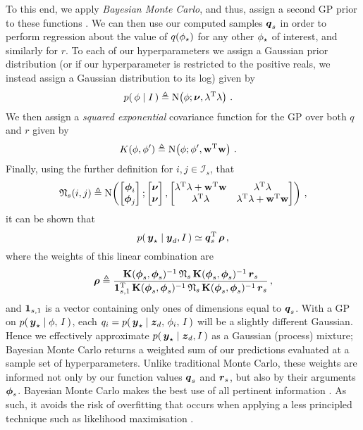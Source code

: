 \documentclass{acmtrans2m}
\begin{document}
To this end, we apply \emph{Bayesian Monte Carlo}, and thus, assign a second GP prior to these functions \cite{BZMonteCarlo}. We can then use our computed samples $\boldsymbol{q}_s$ in order to perform regression about the value of $q(\phi_\star)$ for any other $\phi_\star$ of interest, and similarly for $r$. To each of our hyperparameters we assign a Gaussian prior distribution (or if our hyperparameter is restricted to the positive reals, we instead assign a Gaussian distribution to its log) given by
\begin{align}
 p\!\left(\,\phi\mid I\,\right) & \triangleq \text{N}\!\left(\phi;\boldsymbol{\nu},\mathbf{\lambda}^{\mathrm{T}} \mathbf{\lambda}\right) \label{eq:phiprior}\,.
\end{align}
We then assign a {\em squared exponential} covariance function for the GP over both $q$ and $r$ given by
\begin{align}
 K(\phi,\phi') & \triangleq \text{N}\!\left(\phi;\phi',\mathbf{w}^{\mathrm{T}} \mathbf{w}\right) \label{eq:BMCsqdexp}\,.
\end{align}
Finally, using the further definition for $i,j \in \mathcal{I}_s$, that
\begin{equation}
\mathbf{\mathfrak{N}}_s(i,j) \triangleq \text{N}\!\left(\begin{bmatrix} \boldsymbol{\phi}_i \\ \boldsymbol{\phi}_j \end{bmatrix};\begin{bmatrix} \boldsymbol{\nu} \\ \boldsymbol{\nu} \end{bmatrix},\begin{bmatrix}  \mathbf{\lambda}^{\mathrm{T}} \mathbf{\lambda}+\mathbf{w}^{\mathrm{T}} \mathbf{w} & \mathbf{\lambda}^{\mathrm{T}} \mathbf{\lambda} \\ \mathbf{\lambda}^{\mathrm{T}} \mathbf{\lambda} & \mathbf{\lambda}^{\mathrm{T}} \mathbf{\lambda}+\mathbf{w}^{\mathrm{T}} \mathbf{w}
\end{bmatrix}\right)\,,
\end{equation}
it can be shown that
\begin{equation} \label{eq:muPsi}
p\!\left(\,\boldsymbol{y}_\star\mid\boldsymbol{y}_d,I\,\right) \simeq \boldsymbol{q}_s^{\mathrm{T}}\,\boldsymbol{\rho}\,,
\end{equation}
where the weights of this linear combination are
\begin{equation}
\boldsymbol{\rho}\triangleq\frac{\mathbf{K}(\boldsymbol{\phi}_s,\boldsymbol{\phi}_s)^{-1}\,\mathbf{\mathfrak{N}}_s\,\mathbf{K}(\boldsymbol{\phi}_s,\boldsymbol{\phi}_s)^{-1}\,\boldsymbol{r}_s}
{\mathbf{1}_{s,1}^{\mathrm{T}}\,\mathbf{K}(\boldsymbol{\phi}_s,\boldsymbol{\phi}_s)^{-1}\,\mathbf{\mathfrak{N}}_s\,\mathbf{K}(\boldsymbol{\phi}_s,\boldsymbol{\phi}_s)^{-1}\,\boldsymbol{r}_s}\,,
\end{equation}
and $\mathbf{1}_{s,1}$ is a vector containing only ones of dimensions equal to $\boldsymbol{q}_s$. With a GP on 
$p\!\left(\,\boldsymbol{y}_\star\mid\phi,\,I\,\right)$, each $q_i = p\!\left(\,\boldsymbol{y}_\star\mid\boldsymbol{z}_d,\,\phi_i,\,I\,\right)$ will be a slightly different Gaussian. Hence we effectively approximate $p\!\left(\,\boldsymbol{y}_\star\mid\boldsymbol{z}_d,I\,\right)$ as a Gaussian (process) mixture; Bayesian Monte Carlo returns a weighted sum of our predictions evaluated at a sample set of hyperparameters. Unlike traditional Monte Carlo, these weights are informed not only by our function values $\boldsymbol{q}_s$ and $\boldsymbol{r}_s$, but also by their arguments $\boldsymbol{\phi}_s$. Bayesian Monte Carlo makes the best use of all pertinent information \cite{MCUnsound}. As such, it avoids the risk of overfitting that occurs when applying a less principled technique such as likelihood maximisation \cite{MKBook}.
\end{document}
